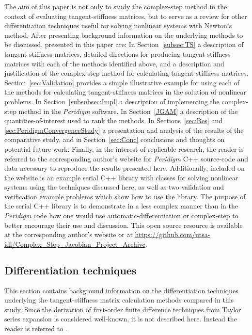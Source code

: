 \documentclass[preprint,12pt]{elsarticle}
\begin{document}
The aim of this paper is not only to  study the complex-step method in the context of evaluating tangent-stiffness matrices, but to serve as a review for other differentiation techniques useful for solving nonlinear systems with Newton's method. After presenting background information on the underlying methods to be discussed, presented in this paper are: In Section~\ref{subsec:TS} a description of tangent-stiffness matrices, detailed directions for producing tangent-stiffness matrices with each of the methods identified above, and a description and justification of the   complex-step method for calculating tangent-stiffness matrices. Section~\ref{sec:Validation} provides a simple illustrative example for using each of the methods for calculating tangent-stiffness matrices in the solution of nonlinear problems. In Section~\ref{subsubsec:Impl} a description of implementing the complex-step method in the \emph{Peridigm} software. In Section~\ref{JGAM} a description of the quantities-of-interest used to rank the methods. In Sections~\ref{sec:Res} and \ref{sec:PeridigmConvergenceStudy} a presentation and analysis of the results of the comparative study, and in Section~\ref{sec:Conc} conclusions and thoughts on potential future work.  Finally, in the interest of replicable research, the reader is referred to the corresponding author's website for \emph{Peridigm} C++ source-code and data necessary to reproduce the results presented here. Additionally, included on the website is an example serial C++ library with classes for solving nonlinear systems using the techniques discussed here, as well as two validation and verification example problems which show how to use the library.  The purpose of the serial C++ library is to demonstrate in a less complex manner than in the \emph{Peridigm} code how one would use automatic-differentiation or complex-step to better encourage their use and discussion.  This open source resource is available at the corresponding author's website or at \href{https://github.com/utsa-idl/Complex_Step_Jacobian_Project_Archive}{https://github.com/utsa-idl/Complex\_Step\_Jacobian\_Project\_Archive}.

\subsection{Differentiation techniques}

This section contains background information on the differentiation techniques underlying the tangent-stiffness matrix calculation methods compared in this study. Since the derivation of first-order finite difference techniques from Taylor series expansion is considered well-known, it is not described here.  Instead the reader is referred to \cite[Chap. 4.1.3]{chapra2010}.
\end{document}
